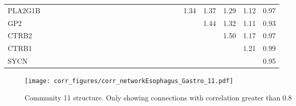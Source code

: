\begin{longtable}{lrrrrrrrrrrrrrrrrrrrrrrrr}
PLA2G1B  &              &              &              &              &             &             &             &             &            &              &            &            &            &             &           &             &                &           &               &      1.34 &        1.37 &        1.29 &       1.12 &        0.97 \\
GP2      &              &              &              &              &             &             &             &             &            &              &            &            &            &             &           &             &                &           &               &           &        1.44 &        1.32 &       1.11 &        0.93 \\
CTRB2    &              &              &              &              &             &             &             &             &            &              &            &            &            &             &           &             &                &           &               &           &             &        1.50 &       1.17 &        0.97 \\
CTRB1    &              &              &              &              &             &             &             &             &            &              &            &            &            &             &           &             &                &           &               &           &             &             &       1.21 &        0.99 \\
SYCN     &              &              &              &              &             &             &             &             &            &              &            &            &            &             &           &             &                &           &               &           &             &             &            &        0.95 \\
\end{longtable}


\begin{figure}[h!]
\centering
\texttt{[image: corr\_figures/corr\_networkEsophagus\_Gastro\_11.pdf]}
\caption{Community 11 structure. Only showing connections with correlation greater than 0.8}
\end{figure}




